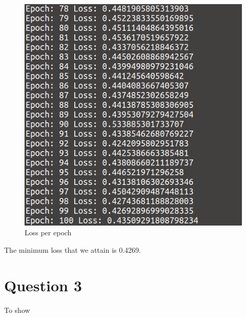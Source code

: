 \documentclass[12pt]{report}
\begin{document}
\begin{figure}[H]
	\centering
	\includegraphics[scale=0.5]{que3_loss}
	\caption{Loss per epoch}
\end{figure}
The minimum loss that we attain is 0.4269.


\chapter{Question 3}
To show 
\end{document}
